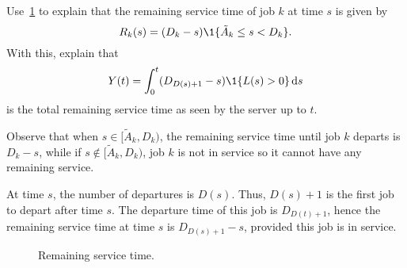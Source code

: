 \begin{exercise}
 Use~\cref{fig:mg1remainingservicetime} to explain that the remaining service time of job $k$ at time $s$ is given by
\begin{equation*}
R_k(s) = (D_k-s)\1{\tilde A_k \leq s < D_k}.
\end{equation*}
With this, explain that
 \begin{equation*}
 Y(t) = \int_0^t (D_{D(s)+1}-s)\1{L(s) > 0} \d s
 \end{equation*}
is the total remaining service time as seen by the server up to $t$. 
\begin{solution}
 Observe that when $s\in [\tilde A_k, D_k)$, the remaining service time until job $k$ departs is $D_k-s $, while if $s\not \in [\tilde A_k, D_k)$, job $k$ is not in service so it cannot have any remaining service.

 At time $s$, the number of departures is $D(s)$.
 Thus, $D(s)+1$ is the first job to depart after time $s$.
 The departure time of this job is $D_{D(t)+1}$, hence the remaining service time at time $s$ is $D_{D(s)+1}-s$, provided this job is in service.
\end{solution}
\end{exercise}


\begin{figure}[htb]
 \centering
{}

 \caption{Remaining service time.}
 \label{fig:mg1remainingservicetime}
\end{figure}

